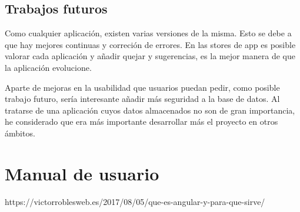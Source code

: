 \documentclass[a4paper, 12pt]{book}
\begin{document}
\section{Trabajos futuros}
\label{sec:trabajos_futuros}

Como cualquier aplicaci\'on, existen varias versiones de la misma. Esto se debe a que hay mejores continuas y correci\'on de errores. En las stores de app es posible valorar cada aplicaci\'on y a\~nadir quejar y sugerencias, es la mejor manera de que la  aplicaci\'on evolucione.

Aparte de mejoras en la usabilidad que usuarios puedan pedir, como posible trabajo futuro, ser\'ia interesante a\~nadir m\'as seguridad a la base de datos. Al tratarse de una aplicaci\'on cuyos datos almacenados no son de gran importancia, he considerado que era m\'as importante desarrollar m\'as el proyecto en otros \'ambitos.




\cleardoublepage
\appendix
\chapter{Manual de usuario}
\label{app:manual}



\cleardoublepage



https://victorroblesweb.es/2017/08/05/que-es-angular-y-para-que-sirve/
\end{document}
